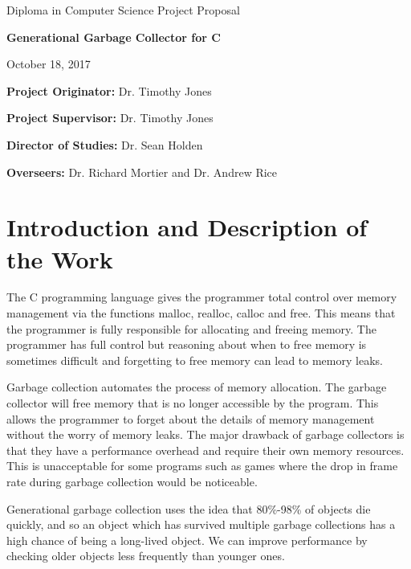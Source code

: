 \documentclass[12pt, a4]{article}
\begin{document}
\medskip
{}
\medskip
{}


\vfil

\centerline{\large Diploma in Computer Science Project Proposal}
\vspace{0.4in}
\centerline{\Large\bf Generational Garbage Collector for C}
\vspace{0.3in}
\centerline{October 18, 2017}

\vfil

{\bf Project Originator:} Dr. Timothy Jones

\vspace{0.5in}

{\bf Project Supervisor:} Dr. Timothy Jones

\vspace{0.5in}

{\bf Director of Studies:} Dr. Sean Holden

\vspace{0.5in}

{\bf Overseers:} Dr. Richard Mortier and Dr. Andrew Rice

\vfil
\eject


\section*{Introduction and Description of the Work}
The C programming language gives the programmer total control over memory management via the functions malloc, realloc, calloc and free. This means that the programmer is fully responsible for allocating and freeing memory. The programmer has full control but reasoning about when to free memory is sometimes difficult and forgetting to free memory can lead to memory leaks.

Garbage collection automates the process of memory allocation. The garbage collector will free memory that is no longer accessible by the program. This allows the programmer to forget about the details of memory management without the worry of memory leaks. The major drawback of garbage collectors is that they have a performance overhead and require their own memory resources. This is unacceptable for some programs such as games where the drop in frame rate during garbage collection would be noticeable.

Generational garbage collection uses the idea that 80\%-98\% of objects die quickly, and so an object which has survived multiple garbage collections has a high chance of being a long-lived object. We can improve performance by checking older objects less frequently than younger ones. 
\end{document}
